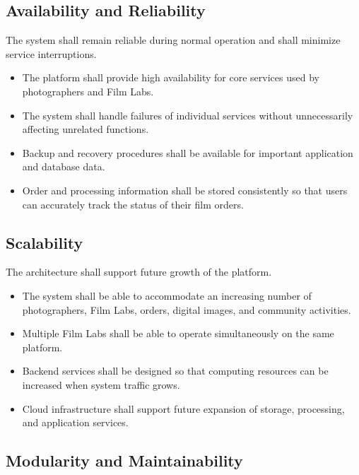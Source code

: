 \subsection{Availability and Reliability}

The system shall remain reliable during normal operation and shall minimize
service interruptions.

\begin{itemize}
    \item The platform shall provide high availability for core services
    used by photographers and Film Labs.

    \item The system shall handle failures of individual services without
    unnecessarily affecting unrelated functions.

    \item Backup and recovery procedures shall be available for important
    application and database data.

    \item Order and processing information shall be stored consistently so
    that users can accurately track the status of their film orders.
\end{itemize}

\subsection{Scalability}

The architecture shall support future growth of the platform.

\begin{itemize}
    \item The system shall be able to accommodate an increasing number of
    photographers, Film Labs, orders, digital images, and community activities.

    \item Multiple Film Labs shall be able to operate simultaneously on
    the same platform.

    \item Backend services shall be designed so that computing resources
    can be increased when system traffic grows.

    \item Cloud infrastructure shall support future expansion of storage,
    processing, and application services.
\end{itemize}

\subsection{Modularity and Maintainability}

